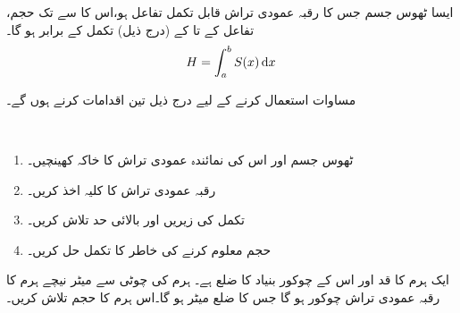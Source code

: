 ایسا ٹھوس جسم جس کا رقبہ عمودی تراش  قابل تکمل تفاعل ہو،اس   کا  سے  تک حجم،  تفاعل  کے   تا   کے (درج ذیل)  تکمل کے برابر  ہو گا۔
\begin{align}\label{مساوات_تکمل_استعمال_تعریف_حجم_الف}
H=\int_a^b S(x)\dif x
\end{align}

مساوات  استعمال کرنے کے لیے درج ذیل تین اقدامات کرنے ہوں گے۔

\\
\begin{enumerate}[1.]
\item
ٹھوس جسم  اور اس کی  نمائندہ عمودی تراش کا خاکہ کھینچیں۔
\item
 رقبہ عمودی تراش  کا کلیہ اخذ کریں۔
\item
تکمل کی  زیریں اور بالائی حد تلاش کریں۔
\item
حجم معلوم کرنے کی خاطر  کا تکمل حل کریں۔
\end{enumerate}

ایک  ہرم  کا قد  اور اس کے چوکور بنیاد کا ضلع  ہے۔ ہرم  کی چوٹی سے  میٹر نیچے  ہرم کا رقبہ عمودی تراش چوکور ہو گا جس کا ضلع  میٹر ہو گا۔اس  ہرم کا حجم تلاش کریں۔

